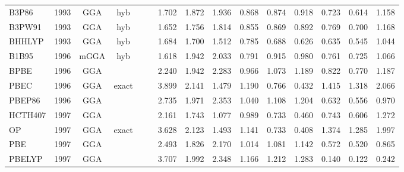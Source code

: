 \begin{landscape}
\begin{longtable}{lc:cccc:rrr:rrr:rrr}
    B3P86            & 1993 & GGA  & hyb      &             &           & 1.702             & 1.872             & 1.936  & 0.868              & 0.874             & 0.918  & 0.723   & 0.614 & 1.158 \\
    B3PW91           & 1993 & GGA  & hyb      &             &           & 1.652             & 1.756             & 1.814  & 0.855              & 0.869             & 0.892  & 0.769   & 0.700 & 1.168 \\
    BHHLYP           & 1993 & GGA  & hyb      &             &           & 1.684             & 1.700             & 1.512  & 0.785              & 0.688             & 0.626  & 0.635   & 0.545 & 1.044 \\
    B1B95            & 1996 & mGGA & hyb      &             &           & 1.618             & 1.942             & 2.033  & 0.791              & 0.915             & 0.980  & 0.761   & 0.725 & 1.066 \\
    BPBE             & 1996 & GGA  &          &             &           & 2.240             & 1.942             & 2.283  & 0.966              & 1.073             & 1.189  & 0.822   & 0.770 & 1.187 \\
    PBEC             & 1996 & GGA  & exact    &             &           & 3.899             & 2.141             & 1.479  & 1.190              & 0.766             & 0.432  & 1.415   & 1.318 & 2.066 \\
    PBEP86           & 1996 & GGA  &          &             &           & 2.735             & 1.971             & 2.353  & 1.040              & 1.108             & 1.204  & 0.632   & 0.556 & 0.970 \\
    HCTH407          & 1997 & GGA  &          &             &           & 2.161             & 1.743             & 1.077  & 0.989              & 0.733             & 0.460  & 0.743   & 0.606 & 1.272 \\
    OP               & 1997 & GGA  & exact    &             &           & 3.628             & 2.123             & 1.493  & 1.141              & 0.733             & 0.408  & 1.374   & 1.285 & 1.997 \\
    PBE              & 1997 & GGA  &          &             &           & 2.493             & 1.826             & 2.170  & 1.014              & 1.081             & 1.142  & 0.572   & 0.520 & 0.865 \\
    PBELYP           & 1997 & GGA  &          &             &           & 3.707             & 1.992             & 2.348  & 1.166              & 1.212             & 1.283  & 0.140   & 0.122 & 0.242 \\

\end{longtable}
\end{landscape}
